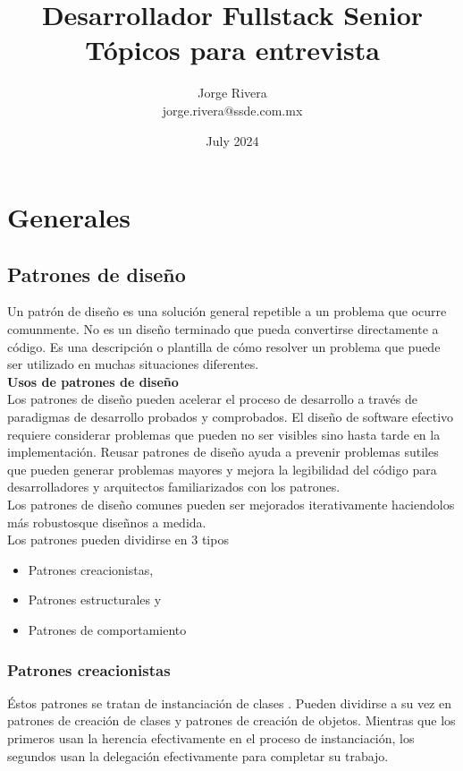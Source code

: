 \documentclass[12pt,article,oneside]{memoir}
\title{Desarrollador Fullstack Senior\\T\'opicos para entrevista}
\author{Jorge Rivera\\jorge.rivera@ssde.com.mx}
\date{July 2024}
\begin{document}
\maketitle
\newpage
\tableofcontents*
\newpage

\part{  Generales}
	\chapter{Patrones de dise\~no}
	Un patr\'on de dise\~no es una soluci\'on general repetible a un problema que ocurre comunmente. No es un dise\~no 
	terminado que pueda convertirse directamente a c\'odigo. Es una descripci\'on o plantilla de c\'omo resolver un problema 
	que puede ser utilizado en muchas situaciones diferentes.\\
	
	\textbf{Usos de patrones de dise\~no}\\
	
	Los patrones de dise\~no pueden acelerar el proceso de desarrollo a trav\'es de paradigmas de desarrollo probados y 
	comprobados. El dise\~no de software efectivo requiere considerar problemas que pueden no ser visibles  sino hasta 
	tarde en la implementaci\'on. Reusar patrones de dise\~no ayuda a prevenir problemas sutiles que pueden generar problemas
	mayores y mejora la legibilidad del c\'odigo para desarrolladores y arquitectos familiarizados con los patrones.\\
	
	Los patrones de dise\~no comunes pueden ser mejorados iterativamente haciendolos m\'as robustosque dise\~nnos a medida.\\
	
	Los patrones pueden dividirse en 3 tipos
	
	\begin{itemize}
		\item Patrones creacionistas,
		\item Patrones estructurales y
		\item Patrones de comportamiento
	\end{itemize}
	\newpage
	
		\section{Patrones creacionistas}
		
		\'Estos patrones se tratan de instanciaci\'on de clases . Pueden dividirse a su vez en patrones de creaci\'on de 
		clases y patrones de creaci\'on de objetos. Mientras que los primeros usan la herencia efectivamente en el proceso 
		de instanciaci\'on, los segundos usan la delegaci\'on efectivamente para completar su trabajo.\\
		
\end{document}

